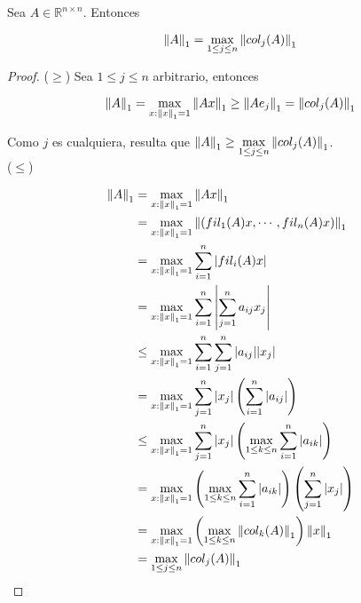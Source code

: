 \begin{propo}
Sea $A \in \mathbb{R}^{n \times n}$. Entonces

\[\left\lVert A\right\rVert_{1} = \max\limits_{1 \leq j \leq n} \left\lVert col_j(A)\right\rVert_1\]

\begin{proof}
($\geq$) Sea $1 \leq j \leq n$ arbitrario, entonces

\[\left\lVert A\right\rVert_1 = \max\limits_{x : \left\lVert x\right\rVert_1 = 1} \left\lVert Ax\right\rVert_1 \geq \left\lVert A e_j\right\rVert_1 = \left\lVert col_j(A)\right\rVert_1\]

Como $j$ es cualquiera, resulta que $\left\lVert A\right\rVert_1 \geq \max\limits_{1 \leq j \leq n} \left\lVert col_j(A)\right\rVert_1$.\\[0.25cm]

($\leq$)

\begin{align*}
\left\lVert A\right\rVert_1 &= \max\limits_{x : \left\lVert x\right\rVert_1 = 1} \left\lVert Ax\right\rVert_1\\
& = \max\limits_{x : \left\lVert x\right\rVert_1 = 1} \left\lVert(fil_1(A) x, \cdots, fil_n(A) x)\right\rVert_1\\
& = \max\limits_{x : \left\lVert x\right\rVert_1 = 1} \sum_{i = 1}^n |fil_i(A) x|\\
& = \max\limits_{x : \left\lVert x\right\rVert_1 = 1} \sum_{i = 1}^n \left|\sum_{j = 1}^n a_{ij} x_j\right|\\
& \leq \max\limits_{x : \left\lVert x\right\rVert_1 = 1} \sum_{i = 1}^n \sum_{j = 1}^n |a_{ij}| |x_j|\\
& = \max\limits_{x : \left\lVert x\right\rVert_1 = 1} \sum_{j = 1}^n |x_j| \left(\sum_{i = 1}^n |a_{ij}|\right)\\
& \leq \max\limits_{x : \left\lVert x\right\rVert_1 = 1} \sum_{j = 1}^n |x_j| \left(\max\limits_{1 \leq k \leq n} \sum_{i = 1}^n |a_{ik}|\right)\\
& = \max\limits_{x : \left\lVert x\right\rVert_1 = 1} \left(\max\limits_{1 \leq k \leq n} \sum_{i = 1}^n |a_{ik}|\right)\left(\sum_{j = 1}^n |x_j|\right)\\
& = \max\limits_{x : \left\lVert x\right\rVert_1 = 1} \left(\max\limits_{1 \leq k \leq n} \left\lVert col_k(A)\right\rVert_1\right) \left\lVert x\right\rVert_1\\
& = \max \limits_{1 \leq j \leq n}\left\lVert col_j(A)\right\rVert_1 
\end{align*}

\end{proof}
\end{propo}

